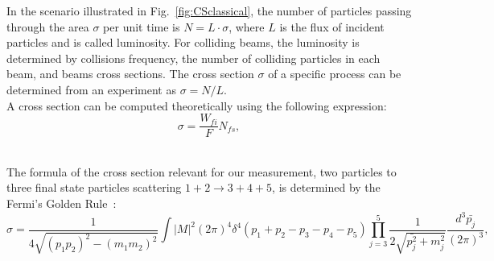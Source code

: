 In the scenario illustrated in Fig.~\ref{fig:CSclassical}, the number of particles passing through the area $\sigma$ per unit time is $N=L \cdot \sigma$, where $L$ is the flux of incident particles and is called luminosity. For colliding beams, the luminosity is determined by collisions frequency, the number of colliding particles in each beam, and beams cross sections. The cross section $\sigma$ of a specific process can be determined from an experiment as $\sigma=N/L$. \\

A cross section can be computed theoretically using the following expression:\\

\begin{equation}
  \sigma = \frac{W_{fi}}{F} N_{fs},
\end{equation}

\\ 

The formula of the cross section relevant for our measurement, two particles to three final state particles scattering $1+2\rightarrow 3+4+5$, is determined by the Fermi's Golden Rule~\cite{ref_Griffiths}: \\

\begin{equation}\label{eq:FermiGoldenRule}
  \sigma = \frac{ 1 }{4\sqrt{(p_1p_2)^2-(m_1m_2)^2}} \int |M|^2 (2\pi)^4 \delta^4(p_1+p_2-p_3-p_4-p_5) \prod_{j=3}^{5} \frac{1}{2 \sqrt{\bar{p_j^2}+m_j^2 }}\frac{d^3\bar{p_j}}{(2\pi)^3},  
\end{equation}

\\ 

